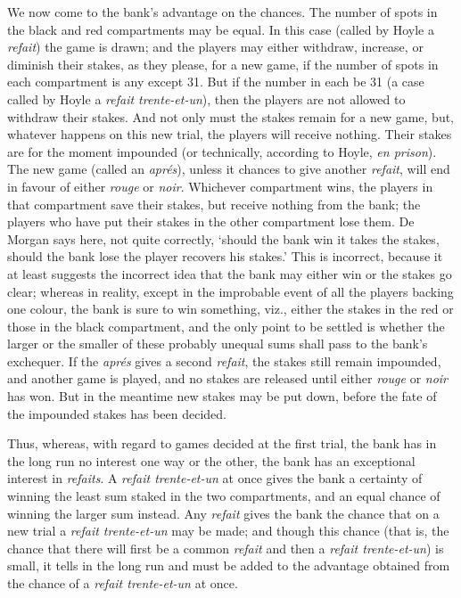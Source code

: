 \documentclass[letterpaper,12pt,oneside,openany]{memoir}
\begin{document}
We now come to the bank's advantage on the
chances. The number of spots in the black and red
compartments may be equal. In this case (called by
Hoyle a \textit{refait}) the game is drawn; and the players may
either withdraw, increase, or diminish their stakes, as
they please, for a new game, if the number of spots in
each compartment is any except 31. But if the number
in each be 31 (a case called by Hoyle a \textit{refait trente-et-un}),
then the players are not allowed to withdraw their
stakes. And not only must the stakes remain for a new
game, but, whatever happens on this new trial, the
players will receive nothing. Their stakes are for the
moment impounded (or technically, according to Hoyle,
\textit{en prison}). The new game (called an \textit{apr{\'e}s}), unless it
chances to give another \textit{refait}, will end in favour of
either \textit{rouge} or \textit{noir}. Whichever compartment wins, the
players in that compartment save their stakes, but
receive nothing from the bank; the players who have
put their stakes in the other compartment lose them.
De Morgan says here, not quite correctly, `should the
bank win it takes the stakes, should the bank lose the
player recovers his stakes.' This is incorrect, because
it at least suggests the incorrect idea that the bank may
either win or the stakes go clear; whereas in reality,
except in the improbable event of all the players backing
one colour, the bank is sure to win something, viz.,
either the stakes in the red or those in the black compartment,
and the only point to be settled is whether
the larger or the smaller of these probably unequal
sums shall pass to the bank's exchequer. If the \textit{apr{\'e}s}
gives a second \textit{refait}, the stakes still remain impounded,
and another game is played, and no stakes are released
until either \textit{rouge} or \textit{noir} has won. But in the meantime
new stakes may be put down, before the fate of
the impounded stakes has been decided.

Thus, whereas, with regard to games decided at the
first trial, the bank has in the long run no interest one
way or the other, the bank has an exceptional interest
in \textit{refaits}. A \textit{refait trente-et-un} at once gives the
bank a certainty of winning the least sum staked in
the two compartments, and an equal chance of winning
the larger sum instead. Any \textit{refait} gives the bank
the chance that on a new trial a \textit{refait trente-et-un} may
be made; and though this chance (that is, the chance
that there will first be a common \textit{refait} and then a \textit{refait
trente-et-un}) is small, it tells in the long run and
must be added to the advantage obtained from the
chance of a \textit{refait trente-et-un} at once.
\end{document}
